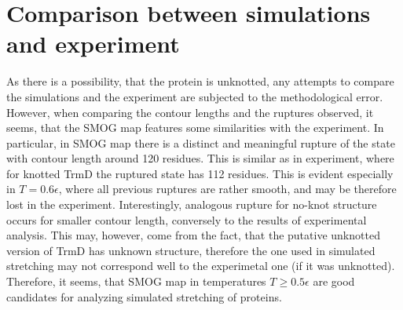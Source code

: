 \section{Comparison between simulations and experiment}
\label{sec:results-comparison}
As there is a possibility, that the protein is unknotted, any attempts to compare the simulations and the experiment are subjected to the methodological error.
However, when comparing the contour lengths and the ruptures observed, it seems, that the SMOG map features some similarities with the experiment.
In particular, in SMOG map there is a distinct and meaningful rupture of the state with contour length around 120 residues.
This is similar as in experiment, where for knotted TrmD the ruptured state has 112 residues.
This is evident especially in $T=0.6\epsilon$, where all previous ruptures are rather smooth, and may be therefore lost in the experiment.
Interestingly, analogous rupture for no-knot structure occurs for smaller contour length, conversely to the results of experimental analysis.
This may, however, come from the fact, that the putative unknotted version of TrmD has unknown structure, therefore the one used in simulated stretching may not correspond well to the experimetal one (if it was unknotted).
Therefore, it seems, that SMOG map in temperatures $T\ge 0.5\epsilon$ are good candidates for analyzing simulated stretching of proteins.




